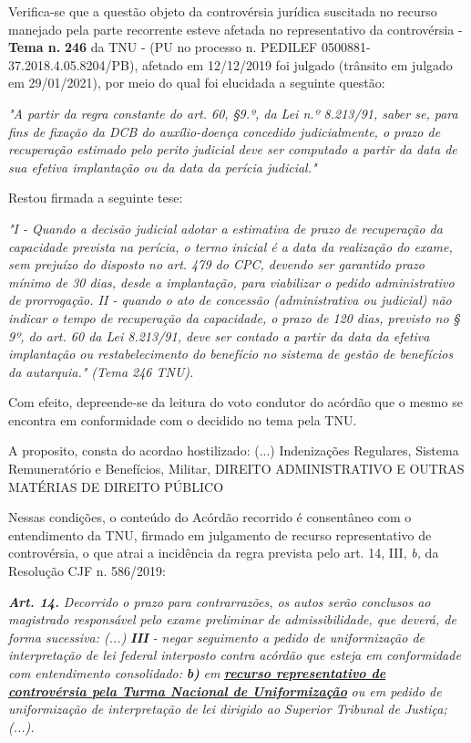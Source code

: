 \documentclass[12pt]{article}
\begin{document}
\justifying
\noindent Verifica-se que a questão objeto da controvérsia jurídica suscitada no recurso manejado pela parte recorrente esteve afetada no representativo da controvérsia - \textbf{Tema n. }\textbf{246} da TNU - (PU no processo n. PEDILEF 0500881-37.2018.4.05.8204/PB),  afetado em 12/12/2019 foi julgado (trânsito em julgado em 29/01/2021), por meio do qual foi elucidada a seguinte questão:

\noindent \textit{"A partir da regra constante do art. 60, §9.º, da Lei n.º 8.213/91, saber se, para fins de fixação da DCB do auxílio-doença concedido judicialmente, o prazo de recuperação estimado pelo perito judicial deve ser computado a partir da data de sua efetiva implantação ou da data da perícia judicial."}

\noindent Restou firmada a seguinte tese:

\noindent \textit{"I - Quando a decisão judicial adotar a estimativa de prazo de recuperação da capacidade prevista na perícia, o termo inicial é a data da realização do exame, sem prejuízo do disposto no art. 479 do CPC, devendo ser garantido prazo mínimo de 30 dias, desde a implantação, para viabilizar o pedido administrativo de prorrogação. II - quando o ato de concessão (administrativa ou judicial) não indicar o tempo de recuperação da capacidade, o prazo de 120 dias, previsto no § 9º, do art. 60 da Lei 8.213/91, deve ser contado a partir da data da efetiva implantação ou restabelecimento do benefício no sistema de gestão de benefícios da autarquia." (Tema 246 TNU).}

\noindent Com efeito, depreende-se da leitura do voto condutor do acórdão que o mesmo se encontra em conformidade com o decidido no  tema pela TNU.

\noindent A proposito, consta do acordao hostilizado: (...) Indenizações Regulares, Sistema Remuneratório e Benefícios, Militar, DIREITO ADMINISTRATIVO E OUTRAS MATÉRIAS DE DIREITO PÚBLICO

\noindent Nessas condições, o conteúdo do Acórdão recorrido é consentâneo com o entendimento da TNU, firmado em julgamento de recurso representativo de controvérsia, o que atrai a incidência da regra prevista pelo art. 14, III, \textit{b,} da Resolução CJF n. 586/2019:

\noindent \textit{\textbf{Art. 14.}}\textit{ Decorrido o prazo para contrarrazões, os autos serão conclusos ao magistrado responsável pelo exame preliminar de admissibilidade, que deverá, de forma sucessiva: (...) }\textit{\textbf{III }}\textit{- negar seguimento a pedido de uniformização de interpretação de lei federal interposto contra acórdão que esteja em conformidade com entendimento consolidado: }\textit{\textbf{b)}}\textit{ em }\uline{\textit{\textbf{recurso representativo de controvérsia pela Turma Nacional de Uniformização}}}\textit{ ou em pedido de uniformização de interpretação de lei dirigido ao Superior Tribunal de Justiça;(...).}
\end{document}

